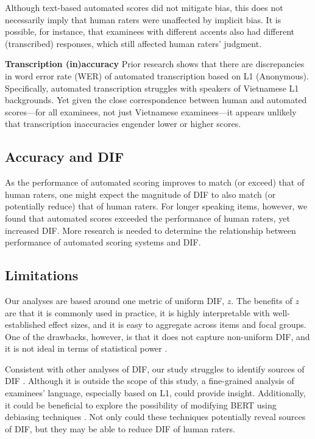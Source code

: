 \documentclass [PhD] {uclathes}
\begin{document}
Although text-based automated scores did not mitigate bias, this does not necessarily imply that human raters were unaffected by implicit bias. It is possible, for instance, that examinees with different accents also had different (transcribed) responses, which still affected human raters' judgment. 

\noindent \textbf{Transcription (in)accuracy} \;
Prior research shows that there are discrepancies in word error rate (WER) of automated transcription based on L1 (Anonymous). Specifically, automated transcription struggles with speakers of Vietnamese L1 backgrounds. Yet given the close correspondence between human and automated scores—for all examinees, not just Vietnamese examinees—it appears unlikely that transcription inaccuracies engender lower or higher scores. 

\subsection{Accuracy and DIF}

As the performance of automated scoring improves to match (or exceed) that of human raters, one might expect the magnitude of DIF to also match (or potentially reduce) that of human raters. For longer speaking items, however, we found that automated scores exceeded the performance of human raters, yet increased DIF. More research is needed to determine the relationship between performance of automated scoring systems and DIF.

\subsection{Limitations}

Our analyses are based around one metric of uniform DIF, $z$. The benefits of $z$ are that it is commonly used in practice, it is highly interpretable with well-established effect sizes, and it is easy to aggregate across items and focal groups. One of the drawbacks, however, is that it does not capture non-uniform DIF, and it is not ideal in terms of statistical power \citep{woods2013}. 

Consistent with other analyses of DIF, our study struggles to identify sources of DIF \citep{zumbo2007}. Although it is outside the scope of this study, a fine-grained analysis of examinees’ language, especially based on L1, could provide insight. Additionally, it could be beneficial to explore the possibility of modifying BERT using debiasing techniques \citep{sun2019mitigating}. Not only could these techniques potentially reveal sources of DIF, but they may be able to reduce DIF of human raters.
\end{document}
